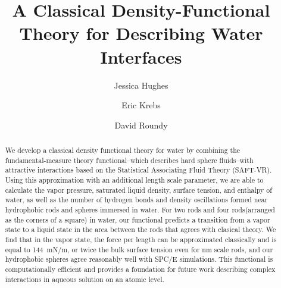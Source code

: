 \documentclass[letterpaper,twocolumn,amsmath,amssymb,prb]{revtex4-1}
\begin{document}
\title{A Classical Density-Functional Theory for Describing Water Interfaces}

\author{Jessica Hughes}
\author{Eric Krebs}
\author{David Roundy}

\begin{abstract}
{We develop a classical density functional theory for water by combining the
fundamental-measure theory functional--which describes hard sphere fluids--with
attractive interactions based on the Statistical Associating Fluid Theory
(SAFT-VR). Using this approximation with an additional length scale parameter, we are able to calculate the vapor pressure, saturated liquid density, surface tension, and enthalpy of water, as well as the number of hydrogen bonds and density oscillations formed near hydrophobic rods and spheres immersed in water. 
For two rods and four rods(arranged as the corners of a square) in water, our functional predicts
a transition from a vapor state to a liquid state in the area between
the rods that agrees with clasical theory.   We find that in the vapor state, the force per length can be
approximated classically and is equal to 144~mN/m, or twice the bulk surface 
tension even for nm scale rods, and  our hydrophobic spheres agree
reasonably well with SPC/E simulations.
This functional is computationally efficient and provides a foundation for 
future work describing complex interactions in aqueous solution on an
atomic level.}
\tableofcontents
\end{abstract}
\maketitle
\end{document}
